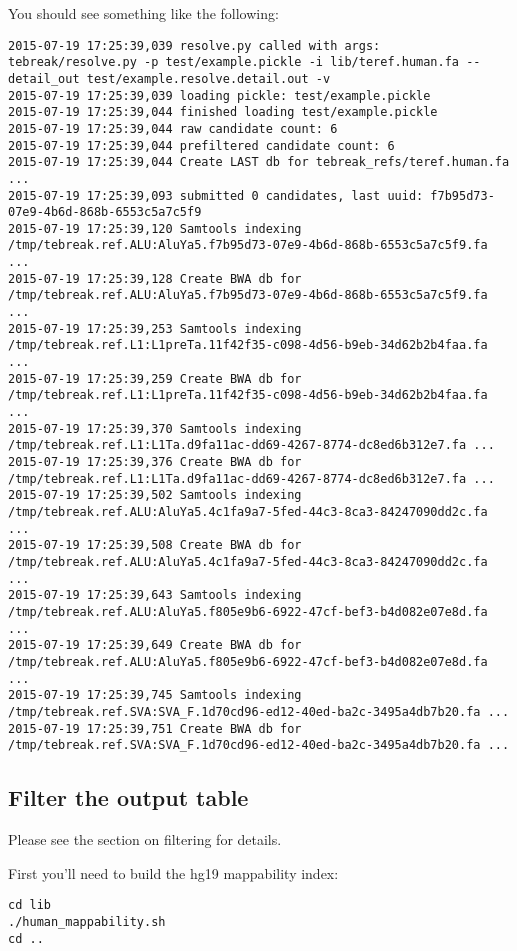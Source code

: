 \documentclass[letterpaper,11pt]{article}
\begin{document}
You should see something like the following:

\begin{verbatim}
2015-07-19 17:25:39,039 resolve.py called with args: tebreak/resolve.py -p test/example.pickle -i lib/teref.human.fa --detail_out test/example.resolve.detail.out -v
2015-07-19 17:25:39,039 loading pickle: test/example.pickle
2015-07-19 17:25:39,044 finished loading test/example.pickle
2015-07-19 17:25:39,044 raw candidate count: 6
2015-07-19 17:25:39,044 prefiltered candidate count: 6
2015-07-19 17:25:39,044 Create LAST db for tebreak_refs/teref.human.fa ...
2015-07-19 17:25:39,093 submitted 0 candidates, last uuid: f7b95d73-07e9-4b6d-868b-6553c5a7c5f9
2015-07-19 17:25:39,120 Samtools indexing /tmp/tebreak.ref.ALU:AluYa5.f7b95d73-07e9-4b6d-868b-6553c5a7c5f9.fa ...
2015-07-19 17:25:39,128 Create BWA db for /tmp/tebreak.ref.ALU:AluYa5.f7b95d73-07e9-4b6d-868b-6553c5a7c5f9.fa ...
2015-07-19 17:25:39,253 Samtools indexing /tmp/tebreak.ref.L1:L1preTa.11f42f35-c098-4d56-b9eb-34d62b2b4faa.fa ...
2015-07-19 17:25:39,259 Create BWA db for /tmp/tebreak.ref.L1:L1preTa.11f42f35-c098-4d56-b9eb-34d62b2b4faa.fa ...
2015-07-19 17:25:39,370 Samtools indexing /tmp/tebreak.ref.L1:L1Ta.d9fa11ac-dd69-4267-8774-dc8ed6b312e7.fa ...
2015-07-19 17:25:39,376 Create BWA db for /tmp/tebreak.ref.L1:L1Ta.d9fa11ac-dd69-4267-8774-dc8ed6b312e7.fa ...
2015-07-19 17:25:39,502 Samtools indexing /tmp/tebreak.ref.ALU:AluYa5.4c1fa9a7-5fed-44c3-8ca3-84247090dd2c.fa ...
2015-07-19 17:25:39,508 Create BWA db for /tmp/tebreak.ref.ALU:AluYa5.4c1fa9a7-5fed-44c3-8ca3-84247090dd2c.fa ...
2015-07-19 17:25:39,643 Samtools indexing /tmp/tebreak.ref.ALU:AluYa5.f805e9b6-6922-47cf-bef3-b4d082e07e8d.fa ...
2015-07-19 17:25:39,649 Create BWA db for /tmp/tebreak.ref.ALU:AluYa5.f805e9b6-6922-47cf-bef3-b4d082e07e8d.fa ...
2015-07-19 17:25:39,745 Samtools indexing /tmp/tebreak.ref.SVA:SVA_F.1d70cd96-ed12-40ed-ba2c-3495a4db7b20.fa ...
2015-07-19 17:25:39,751 Create BWA db for /tmp/tebreak.ref.SVA:SVA_F.1d70cd96-ed12-40ed-ba2c-3495a4db7b20.fa ...
\end{verbatim}

\subsection{Filter the output table}

Please see the section on filtering for details.

First you'll need to build the hg19 mappability index:

\begin{verbatim}
cd lib
./human_mappability.sh
cd ..
\end{verbatim}
\end{document}
